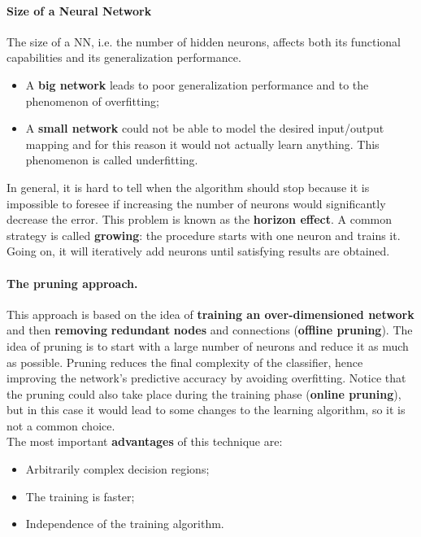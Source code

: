 \paragraph*{Size of a Neural Network} 
The size of a NN, i.e. the number of hidden neurons, affects both its functional capabilities and its generalization performance.
\begin{itemize}
	\item A \textbf{big network} leads to poor generalization performance and to the phenomenon of overfitting;
	\item A \textbf{small network} could not be able to model the desired input/output mapping and for this reason it would not actually learn anything. This phenomenon is called underfitting.
\end{itemize}

In general, it is hard to tell when the algorithm should stop because it is impossible to foresee if increasing the number of neurons would significantly decrease the error. This problem is known as the \textbf{horizon effect}. A common strategy is called \textbf{growing}: the procedure starts with one neuron and trains it. Going on, it will iteratively add neurons until satisfying results are obtained.

\paragraph*{The pruning approach.} This approach is based on the idea of \textbf{training an over-dimensioned network} and then \textbf{removing} \textbf{redundant} \textbf{nodes} and connections (\textbf{offline pruning}). The idea of pruning is to start with a large number of neurons and reduce it as much as possible. Pruning reduces the final complexity of the classifier, hence improving the network's predictive accuracy by avoiding overfitting. Notice that the pruning could also take place during the training phase (\textbf{online pruning}), but in this case it would lead to some changes to the learning algorithm, so it is not a common choice.\\
The most important \textbf{advantages} of this technique are:
\begin{itemize}
	\item Arbitrarily complex decision regions;
	\item The training is faster;
	\item Independence of the training algorithm.
\end{itemize}


